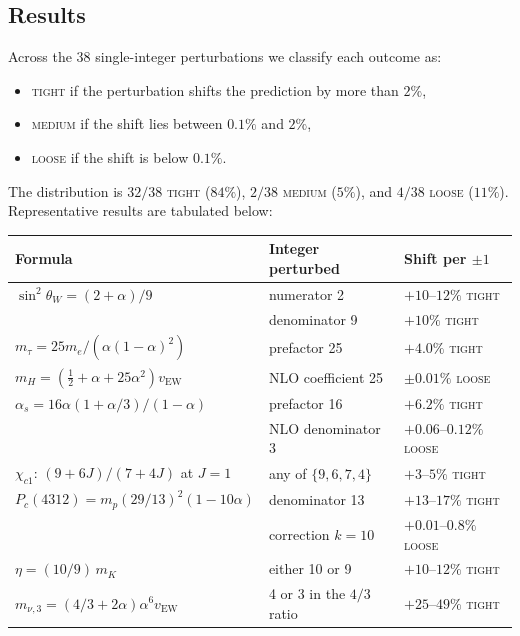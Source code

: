 \documentclass[11pt]{article}
\begin{document}
\subsection{Results}

Across the 38 single-integer perturbations we classify each
outcome as:
\begin{itemize}
  \item \textsc{tight} if the perturbation shifts the prediction by
        more than $2\%$,
  \item \textsc{medium} if the shift lies between $0.1\%$ and $2\%$,
  \item \textsc{loose} if the shift is below $0.1\%$.
\end{itemize}
The distribution is $32/38$ \textsc{tight} ($84\%$), $2/38$
\textsc{medium} ($5\%$), and $4/38$ \textsc{loose} ($11\%$).
Representative results are tabulated below:

\begin{center}
\begin{tabular}{lll}
\hline
\textbf{Formula} & \textbf{Integer perturbed} & \textbf{Shift per $\pm 1$} \\
\hline
$\sin^2\theta_W = (2+\alpha)/9$ & numerator 2 & $+10$--$12\%$ \textsc{tight} \\
                                 & denominator 9 & $+10\%$ \textsc{tight} \\
$m_\tau = 25 m_e / (\alpha(1-\alpha)^2)$ & prefactor 25 & $+4.0\%$ \textsc{tight} \\
$m_H = (\tfrac{1}{2}+\alpha+25\alpha^2)v_\text{EW}$ & NLO coefficient 25 & $\pm 0.01\%$ \textsc{loose} \\
$\alpha_s = 16\alpha(1+\alpha/3)/(1-\alpha)$ & prefactor 16 & $+6.2\%$ \textsc{tight} \\
                                             & NLO denominator 3 & $+0.06$--$0.12\%$ \textsc{loose} \\
$\chi_{c1}$: $(9+6J)/(7+4J)$ at $J=1$ & any of $\{9,6,7,4\}$ & $+3$--$5\%$ \textsc{tight} \\
$P_c(4312) = m_p(29/13)^2(1-10\alpha)$ & denominator 13 & $+13$--$17\%$ \textsc{tight} \\
                                       & correction $k=10$ & $+0.01$--$0.8\%$ \textsc{loose} \\
$\eta = (10/9)\,m_K$ & either 10 or 9 & $+10$--$12\%$ \textsc{tight} \\
$m_{\nu,3} = (4/3+2\alpha)\alpha^6 v_\text{EW}$ & 4 or 3 in the $4/3$ ratio & $+25$--$49\%$ \textsc{tight} \\
\hline
\end{tabular}
\end{center}
\end{document}
